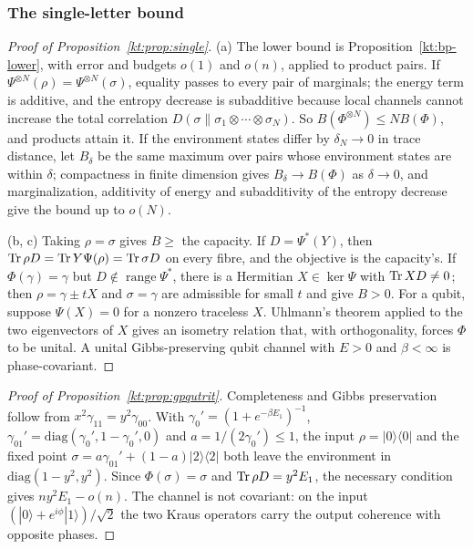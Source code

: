 \subsubsection{The single-letter bound}\label{kt:pf:single}

\begin{proof}[Proof of Proposition~\ref{kt:prop:single}]
(a) The lower bound is Proposition~\ref{kt:bp-lower}, with error and budgets $o(1)$ and $o(n)$, applied to product pairs. If $\Psi^{\otimes N}(\rho)=\Psi^{\otimes N}(\sigma)$, equality passes to every pair of marginals; the energy term is additive, and the entropy decrease is subadditive because local channels cannot increase the total correlation $D(\sigma\|\sigma_1\otimes\cdots\otimes\sigma_N)$. So $B(\Phi^{\otimes N})\le NB(\Phi)$, and products attain it. If the environment states differ by $\delta_N\to0$ in trace distance, let $B_\delta$ be the same maximum over pairs whose environment states are within $\delta$; compactness in finite dimension gives $B_\delta\to B(\Phi)$ as $\delta\to0$, and marginalization, additivity of energy and subadditivity of the entropy decrease give the bound up to $o(N)$.

(b, c) Taking $\rho=\sigma$ gives $B\ge$ the capacity. If $D=\Psi^*(Y)$, then $\operatorname{Tr}\rho D=\operatorname{Tr} Y\Psi(\rho)=\operatorname{Tr}\sigma D$ on every fibre, and the objective is the capacity's. If $\Phi(\gamma)=\gamma$ but $D\notin\operatorname{range}\Psi^*$, there is a Hermitian $X\in\ker\Psi$ with $\operatorname{Tr} XD\neq0$; then $\rho=\gamma\pm tX$ and $\sigma=\gamma$ are admissible for small $t$ and give $B>0$. For a qubit, suppose $\Psi(X)=0$ for a nonzero traceless $X$. Uhlmann's theorem applied to the two eigenvectors of $X$ gives an isometry relation that, with orthogonality, forces $\Phi$ to be unital. A unital Gibbs-preserving qubit channel with $E>0$ and $\beta<\infty$ is phase-covariant.

\end{proof}

\begin{proof}[Proof of Proposition~\ref{kt:prop:gpqutrit}]
Completeness and Gibbs preservation follow from $x^2\gamma_{11}=y^2\gamma_{00}$. With $\gamma_0'=(1+e^{-\beta E_1})^{-1}$, $\gamma_{01}'=\mathrm{diag}(\gamma_0',1-\gamma_0',0)$ and $a=1/(2\gamma_0')\le1$, the input $\rho=|0\rangle\langle0|$ and the fixed point $\sigma=a\gamma_{01}'+(1-a)|2\rangle\langle2|$ both leave the environment in $\mathrm{diag}(1-y^2,y^2)$. Since $\Phi(\sigma)=\sigma$ and $\operatorname{Tr}\rho D=y^2E_1$, the necessary condition gives $ny^2E_1-o(n)$. The channel is not covariant: on the input $(|0\rangle+e^{i\phi}|1\rangle)/\sqrt2$ the two Kraus operators carry the output coherence with opposite phases.
\end{proof}

